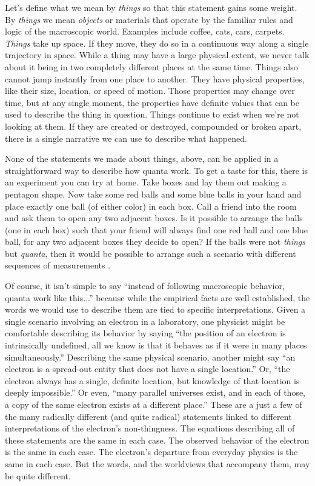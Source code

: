 \documentclass[12pt,onecolumn,preprintnumbers,amsmath,amssymbn,reprint,nofootinbib,superscriptaddress]{revtex4}    %
\begin{document}
Let's define what we mean by {\em things} so that this statement gains some weight.  By {\em things} we mean {\em objects} or materials that operate by the familiar rules and logic of the macroscopic world.  Examples include coffee, cats, cars, carpets.  {\em Things} take up space.  If they move, they do so in a continuous way along a single trajectory in space.  While a thing may have a large physical extent, we never talk about it being in two completely different places at the same time.  Things also cannot jump instantly from one place to another.  They have physical properties, like their size, location, or speed of motion.  Those properties may change over time, but at any single moment, the properties have definite values that can be used to describe the thing in question.  Things continue to exist when we're not looking at them.  If they are created or destroyed, compounded or broken apart, there is a single narrative we can use to describe what happened.  

None of the statements we made about things, above, can be applied in a straightforward way to describe how quanta work.  To get a taste for this, there is an experiment you can try at home. Take boxes and lay them out making a pentagon shape. Now take some red balls and some blue balls in your hand and place exactly one ball (of either color) in each box. Call a friend into the room and ask them to open any two adjacent boxes. Is it possible to arrange the balls (one in each box) such that your friend will always find one red ball and one blue ball, for any two adjacent boxes they decide to open?  If the balls were not \textit{things} but \textit{quanta}, then it would be possible to arrange such a scenario with different sequences of measurements \cite{Liang}.

Of course, it isn't simple to say ``instead of following macroscopic behavior, quanta work like this...''  because while the empirical facts are well established, the words we would use to describe them are tied to specific interpretations. Given a single scenario involving an electron in a laboratory, one physicist might be comfortable describing its behavior by saying ``the position of an electron is intrinsically undefined, all we know is that it behaves as if it were in many places simultaneously.''  Describing the same physical scenario, another might say ``an electron is a spread-out entity that does not have a single location.''  Or, ``the electron always has a single, definite location, but knowledge of that location is deeply impossible.''   Or even, ``many parallel universes exist, and in each of those, a copy of the same electron exists at a different place.'' These are a just a few of the many radically different (and quite radical) statements linked to different interpretations of the electron's non-thingness.  The equations describing all of these statements are the same in each case.  The observed behavior of the electron is the same in each case.  The electron's departure from everyday physics is the same in each case.  But the words, and the worldviews that accompany them, may be quite different. 
\end{document}

